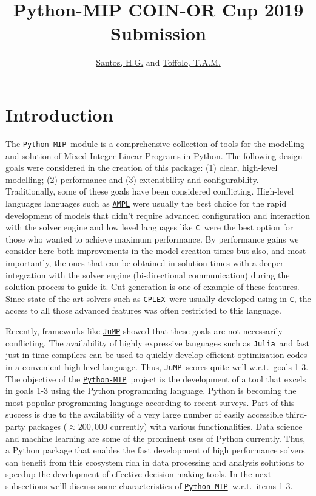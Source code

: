 \documentclass{article}
\title{Python-MIP COIN-OR Cup 2019 Submission }
\author{\href{http://www.decom.ufop.br/haroldo/}{Santos, H.G.} and \href{http://www.decom.ufop.br/toffolo}{Toffolo, T.A.M.}}
\def\C{\texttt{C}}
\def\CPLEX{\href{https://www.ibm.com/analytics/cplex-optimizer}{\texttt{CPLEX}\textsuperscript{\textregistered}}}
\def\JuMP{\href{https://github.com/JuliaOpt/JuMP.jl}{\texttt{JuMP}}}
\def\Julia{\texttt{Julia}}
\def\PythonMIP{\href{https://github.com/coin-or/python-mip}{\texttt{Python-MIP}}}
\def\AMPL{\href{https://ampl.com}{\texttt{AMPL}}}
\begin{document}
\maketitle

\section{Introduction}

The \PythonMIP\ module is a comprehensive collection of tools for the modelling and solution of Mixed-Integer Linear Programs in Python. The following design goals were considered in the creation of this package: (1) clear, high-level modelling; (2) performance and (3) extensibility and configurability.
Traditionally, some of these goals have been considered conflicting. High-level languages languages such as \AMPL \cite{Fourer1987} were usually the best choice for the rapid development of models that didn't require advanced configuration and interaction with the solver engine and low level languages like \C\ were the best option for those who wanted to achieve maximum performance. By performance gains we consider here both improvements in the model creation times but also, and most importantly, the ones that can be obtained in solution times with a deeper integration with the solver engine (bi-directional communication) during the solution process to guide it. Cut generation is one of example of these features. Since state-of-the-art solvers such as \CPLEX\ were usually developed using in \texttt{C}\cite{Bixby2002}, the access to all those advanced features was often restricted to this language. 

Recently, frameworks like \JuMP \cite{Dunning2015} showed that these goals are not necessarily conflicting. The availability of highly expressive languages such as \Julia\ and fast just-in-time compilers can be used to quickly develop efficient optimization codes in a convenient high-level language. Thus, \JuMP\ scores quite well w.r.t.\ goals 1-3. The objective of the \PythonMIP\ project is the development of a tool that excels in goals 1-3 using the Python programming language. Python is becoming the most popular\cite{Econ2018} programming language according to recent surveys. Part of this success is due to the availability of a very large number of easily accessible third-party packages ($\approx 200,000$ currently) with various functionalities. Data science and machine learning are some of the prominent uses of Python currently. Thus, a Python package that enables the fast development of high performance solvers can benefit from this ecosystem rich in data processing and analysis solutions to speedup the development of effective decision making tools. In the next subsections we'll discuss some characteristics of \PythonMIP\ w.r.t.\ items 1-3.
\end{document}
